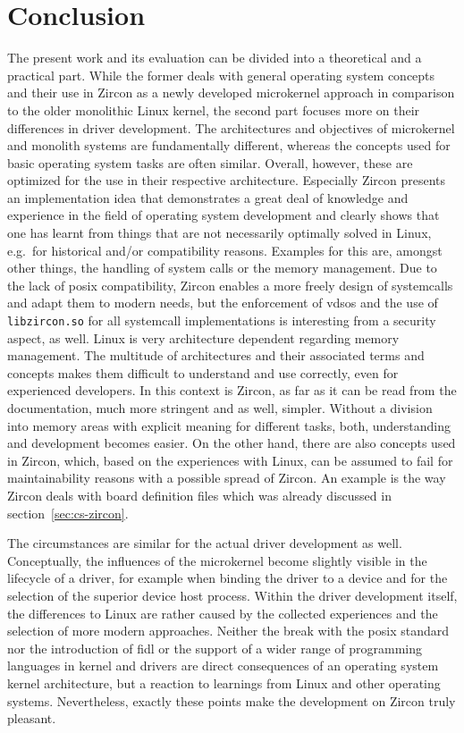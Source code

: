 
\chapter{Conclusion}\label{ch:conclusion}
The present work and its evaluation can be divided into a theoretical and a practical part.
While the former deals with general operating system concepts and their use in Zircon as a newly developed microkernel approach in comparison to the older monolithic Linux kernel, the second part focuses more on their differences in driver development.
The architectures and objectives of microkernel and monolith systems are fundamentally different, whereas the concepts used for basic operating system tasks are often similar.
Overall, however, these are optimized for the use in their respective architecture.
Especially Zircon presents an implementation idea that demonstrates a great deal of knowledge and experience in the field of operating system development and clearly shows that one has learnt from things that are not necessarily optimally solved in Linux, e.g.\ for historical and/or compatibility reasons.
Examples for this are, amongst other things, the handling of system calls or the memory management.
Due to the lack of \ac{posix} compatibility, Zircon enables a more freely design of systemcalls and adapt them to modern needs, but the enforcement of \acp{vdso} and the use of \texttt{libzircon.so} for all systemcall implementations is interesting from a security aspect, as well.
Linux is very architecture dependent regarding memory management.
The multitude of architectures and their associated terms and concepts makes them difficult to understand and use correctly, even for experienced developers.
In this context is Zircon, as far as it can be read from the documentation, much more stringent and as well, simpler.
Without a division into memory areas with explicit meaning for different tasks, both, understanding and development becomes easier.
On the other hand, there are also concepts used in Zircon, which, based on the experiences with Linux, can be assumed to fail for maintainability reasons with a possible spread of Zircon.
An example is the way Zircon deals with board definition files which was already discussed in section~\ref{sec:cs-zircon}.

The circumstances are similar for the actual driver development as well.
Conceptually, the influences of the microkernel become slightly visible in the lifecycle of a driver, for example when binding the driver to a device and for the selection of the superior device host process.
Within the driver development itself, the differences to Linux are rather caused by the collected experiences and the selection of more modern approaches.
Neither the break with the \ac{posix} standard nor the introduction of \ac{fidl} or the support of a wider range of programming languages in kernel and drivers are direct consequences of an operating system kernel architecture, but a reaction to learnings from Linux and other operating systems.
Nevertheless, exactly these points make the development on Zircon truly pleasant.

